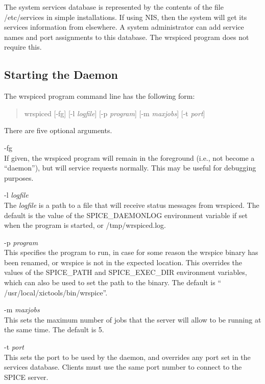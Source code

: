 The system services database is represented by the contents of the
file {\vt /etc/services} in simple installations.  If using NIS, then
the system will get its services information from elsewhere.  A system
administrator can add service names and port assignments to this
database.  The {\vt wrspiced} program does not require this.

\subsection{Starting the Daemon}

The {\vt wrspiced} program command line has the following form:

\begin{quote}
{\vt wrspiced} [{\vt -fg}] [{\vt -l} {\it logfile\/}]
  [{\vt -p} {\it program\/}] [{\vt -m} {\it maxjobs\/}] [{\vt -t} {\it port\/}]
\end{quote}

There are five optional arguments.
\begin{description}
\item{\vt -fg}\\
If given, the {\vt wrspiced} program will remain in the foreground
(i.e., not become a ``daemon''), but will service requests normally. 
This may be useful for debugging purposes.

\item{{\vt -l} {\it logfile}}\\
The {\it logfile} is a path to a file that will receive status
messages from {\vt wrspiced}.  The default is the value of the {\et
SPICE\_DAEMONLOG} environment variable if set when the program is
started, or {\vt /tmp/wrspiced.log}.

\item{{\vt -p} {\it program}}\\
This specifies the {\WRspice} program to run, in case for some reason
the {\vt wrspice} binary has been renamed, or {\vt wrspice} is not in
the expected location.  This overrides the values of the {\et
SPICE\_PATH} and {\et SPICE\_EXEC\_DIR} environment variables, which
can also be used to set the path to the binary.  The default is ``{\vt
/usr/local/xictools/bin/wrspice}''.

\item{{\vt -m} {\it maxjobs}}\\
This sets the maximum number of jobs that the server will allow to be
running at the same time.  The default is 5.

\item{{\vt -t} {\it port}}\\
This sets the port to be used by the daemon, and overrides any port
set in the services database.  Clients must use the same port number
to connect to the SPICE server.
\end{description}

